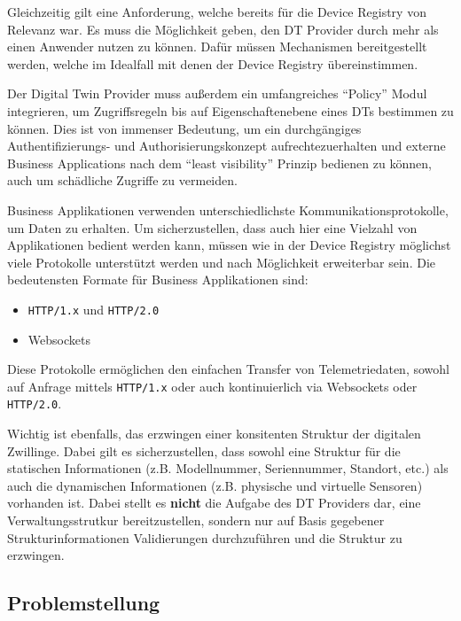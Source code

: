 Gleichzeitig gilt eine Anforderung, welche bereits für die Device Registry von Relevanz war. Es muss die Möglichkeit geben, den \ac{DT} Provider durch mehr als einen Anwender nutzen zu können. Dafür müssen Mechanismen bereitgestellt werden, welche im Idealfall mit denen der Device Registry übereinstimmen.

Der Digital Twin Provider muss außerdem ein umfangreiches \enquote{Policy} Modul integrieren, um Zugriffsregeln bis auf Eigenschaftenebene eines \ac{DT}s bestimmen zu können. Dies ist von immenser Bedeutung, um ein durchgängiges Authentifizierungs- und Authorisierungskonzept aufrechtezuerhalten und externe Business Applications nach dem \enquote{least visibility} Prinzip bedienen zu können, auch um schädliche Zugriffe zu vermeiden.

Business Applikationen verwenden unterschiedlichste Kommunikationsprotokolle, um Daten zu erhalten. Um sicherzustellen, dass auch hier eine Vielzahl von Applikationen bedient werden kann, müssen wie in der Device Registry möglichst viele Protokolle unterstützt werden und nach Möglichkeit erweiterbar sein. Die bedeutensten Formate für Business Applikationen sind:

\begin{itemize}
    \item \texttt{HTTP/1.x} und \texttt{HTTP/2.0}
    \item Websockets
\end{itemize}

Diese Protokolle ermöglichen den einfachen Transfer von Telemetriedaten, sowohl auf Anfrage mittels \texttt{HTTP/1.x} oder auch kontinuierlich via Websockets oder \texttt{HTTP/2.0}.

Wichtig ist ebenfalls, das erzwingen einer konsitenten Struktur der digitalen Zwillinge. Dabei gilt es sicherzustellen, dass sowohl eine Struktur für die statischen Informationen (z.B. Modellnummer, Seriennummer, Standort, etc.) als auch die dynamischen Informationen (z.B. physische und virtuelle Sensoren) vorhanden ist. Dabei stellt es \textbf{nicht} die Aufgabe des \ac{DT} Providers dar, eine Verwaltungsstrutkur bereitzustellen, sondern nur auf Basis gegebener Strukturinformationen Validierungen durchzuführen und die Struktur zu erzwingen.

\subsection{Problemstellung}

